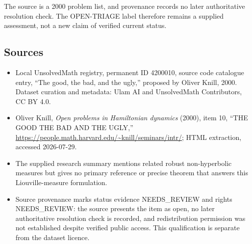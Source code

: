 \documentclass[11pt]{article}
\begin{document}
The source is a 2000 problem list, and provenance records no later authoritative resolution check. The OPEN-TRIAGE label therefore remains a supplied assessment, not a new claim of verified current status.
\subsection{Sources}
\begin{itemize}
\item Local UnsolvedMath registry, permanent ID 4200010, source code catalogue entry, ``The good, the bad, and the ugly,'' proposed by Oliver Knill, 2000. Dataset curation and metadata: Ulam AI and UnsolvedMath Contributors, CC BY 4.0.
\item Oliver Knill, \emph{Open problems in Hamiltonian dynamics} (2000), item 10, ``THE GOOD THE BAD AND THE UGLY,'' \url{https://people.math.harvard.edu/~knill/seminars/intr/}; HTML extraction, accessed 2026-07-29.
\item The supplied research summary mentions related robust non-hyperbolic measures but gives no primary reference or precise theorem that answers this Liouville-measure formulation.
\item Source provenance marks status evidence NEEDS\_REVIEW and rights NEEDS\_REVIEW: the source presents the item as open, no later authoritative resolution check is recorded, and redistribution permission was not established despite verified public access. This qualification is separate from the dataset licence.
\end{itemize}
\end{document}
